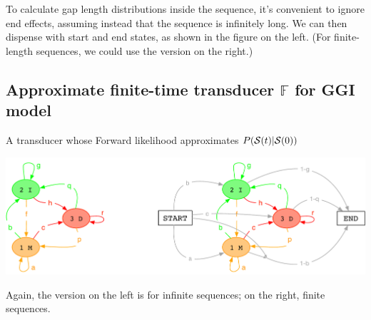 \documentclass{article}
\begin{document}
To calculate gap length distributions inside the sequence, it's convenient to ignore end effects,
assuming instead that the sequence is infinitely long.
We can then dispense with start and end states, as shown in the figure on the left.
(For finite-length sequences, we could use the version on the right.)

\subsection{Approximate finite-time transducer $\mathbb{F}$ for GGI model}

A transducer whose Forward likelihood approximates $P({\cal S}(t)|{\cal S}(0))$

\includegraphics[width=\textwidth]{PairHMM.pdf}

Again, the version on the left is for infinite sequences; on the right, finite sequences.
\end{document}
